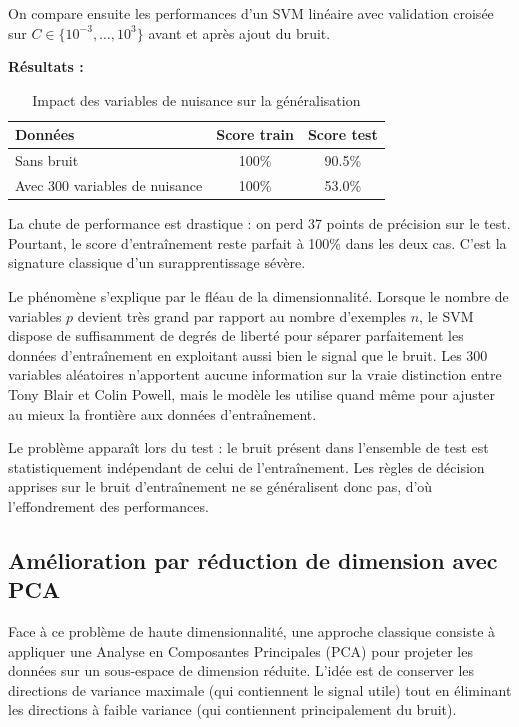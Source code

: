 \documentclass[11pt,a4paper]{article}
\begin{document}
On compare ensuite les performances d'un SVM linéaire avec validation croisée sur $C \in \{10^{-3}, \ldots, 10^3\}$ avant et après ajout du bruit.

\textbf{Résultats :}
\begin{table}[h]
\centering
\begin{tabular}{|l|c|c|}
\hline
\textbf{Données} & \textbf{Score train} & \textbf{Score test} \\
\hline
Sans bruit & 100\% & 90.5\% \\
\hline
Avec 300 variables de nuisance & 100\% & 53.0\% \\
\hline
\end{tabular}
\caption{Impact des variables de nuisance sur la généralisation}
\end{table}

La chute de performance est drastique : on perd 37 points de précision sur le test. Pourtant, le score d'entraînement reste parfait à 100\% dans les deux cas. C'est la signature classique d'un surapprentissage sévère.

Le phénomène s'explique par le fléau de la dimensionnalité. Lorsque le nombre de variables $p$ devient très grand par rapport au nombre d'exemples $n$, le SVM dispose de suffisamment de degrés de liberté pour séparer parfaitement les données d'entraînement en exploitant aussi bien le signal que le bruit. Les 300 variables aléatoires n'apportent aucune information sur la vraie distinction entre Tony Blair et Colin Powell, mais le modèle les utilise quand même pour ajuster au mieux la frontière aux données d'entraînement.

Le problème apparaît lors du test : le bruit présent dans l'ensemble de test est statistiquement indépendant de celui de l'entraînement. Les règles de décision apprises sur le bruit d'entraînement ne se généralisent donc pas, d'où l'effondrement des performances.

\subsection{Amélioration par réduction de dimension avec PCA}

Face à ce problème de haute dimensionnalité, une approche classique consiste à appliquer une Analyse en Composantes Principales (PCA) pour projeter les données sur un sous-espace de dimension réduite. L'idée est de conserver les directions de variance maximale (qui contiennent le signal utile) tout en éliminant les directions à faible variance (qui contiennent principalement du bruit).
\end{document}
